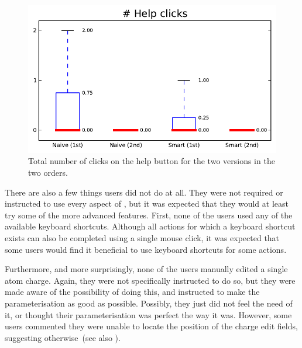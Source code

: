 \begin{figure}[h!]
\center
\includegraphics[width=.6\textwidth]{img/graphs/1b_01.pdf}
\caption{Total number of clicks on the help button for the two versions in the two orders.}
\end{figure}

There are also a few things users did not do at all. They were not required or instructed to use every aspect of \oframp, but it was expected that they would at least try some of the more advanced features. First, none of the users used any of the available keyboard shortcuts. Although all actions for which a keyboard shortcut exists can also be completed using a single mouse click, it was expected that some users would find it beneficial to use keyboard shortcuts for some actions.

Furthermore, and more surprisingly, none of the users manually edited a single atom charge. Again, they were not specifically instructed to do so, but they were made aware of the possibility of doing this, and instructed to make the parameterisation as good as possible. Possibly, they just did not feel the need of it, or thought their parameterisation was perfect the way it was. However, some users commented they were unable to locate the position of the charge edit fields, suggesting otherwise~(see also ).

